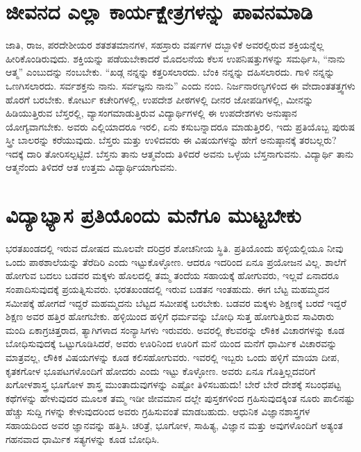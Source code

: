 \section{ಜೀವನದ ಎಲ್ಲಾ ಕಾರ್ಯಕ್ಷೇತ್ರಗಳನ್ನು ಪಾವನಮಾಡಿ}

ಜಾತಿ, ರಾಜ, ಪರದೇಶೀಯರ ಶತಶತಮಾನಗಳ, ಸಹಸ್ರಾರು ವರ್ಷಗಳ ದಬ್ಬಾಳಿಕೆ ಅವರಲ್ಲಿರುವ ಶಕ್ತಿಯನ್ನೆಲ್ಲ ಹೀರಿಕೊಂಡಿರುವುದು. ಶಕ್ತಿಯನ್ನು ಪಡೆಯಬೇಕಾದರೆ ಮೊದಲನೆಯ ಕೆಲಸ ಉಪನಿಷತ್ತುಗಳನ್ನು ಸಮರ್ಥಿಸಿ, “ನಾನು ಆತ್ಮ” ಎಂಬುದನ್ನು ನಂಬಬೇಕು. “ಖಡ್ಗ ನನ್ನನ್ನು ಕತ್ತರಿಸಲಾರದು. ಬೆಂಕಿ ನನ್ನನ್ನು ದಹಿಸಲಾರದು. ಗಾಳಿ ನನ್ನನ್ನು ಒಣಗಿಸಲಾರದು. ಸರ್ವಶಕ್ತನು ನಾನು. ಸರ್ವಜ್ಞನು ನಾನು” ಎಂದು ನಂಬಿ. ನಿರ್ಜನಾರಣ್ಯಗಳಿಂದ ಈ ವೇದಾಂತತತ್ತ್ವಗಳು ಹೊರಗೆ ಬರಬೇಕು. ಕೋರ್ಟು ಕಚೇರಿಗಳಲ್ಲಿ, ಉಪದೇಶ ಪೀಠಗಳಲ್ಲಿ ದೀನರ ಜೋಪಡಿಗಳಲ್ಲಿ, ಮೀನನ್ನು ಹಿಡಿಯುತ್ತಿರುವ ಬೆಸ್ತರಲ್ಲಿ, ವ್ಯಾಸಂಗಮಾಡುತ್ತಿರುವ ವಿದ್ಯಾರ್ಥಿಗಳಲ್ಲಿ ಈ ಉಪದೇಶಗಳು ಅನುಷ್ಠಾನ ಯೋಗ್ಯವಾಗಬೇಕು. ಅವರು ಎಲ್ಲಿಯಾದರೂ ಇರಲಿ, ಏನು ಕಸುಬನ್ನಾದರೂ ಮಾಡುತ್ತಿರಲಿ, ಇದು ಪ್ರತಿಯೊಬ್ಬ ಪುರುಷ ಸ್ತ್ರೀ ಬಾಲರನ್ನು ಕರೆಯುವುದು. ಬೆಸ್ತರು ಮತ್ತು ಉಳಿದವರು ಈ ವಿಷಯಗಳನ್ನು ಹೇಗೆ ಅನುಷ್ಠಾನಕ್ಕೆ ತರಬಲ್ಲರು? ಇದಕ್ಕೆ ದಾರಿ ತೋರಿಸಲ್ಪಟ್ಟಿದೆ. ಬೆಸ್ತನು ತಾನು ಆತ್ಮವೆಂದು ತಿಳಿದರೆ ಅವನು ಒಳ್ಳೆಯ ಬೆಸ್ತನಾಗುವನು. ವಿದ್ಯಾರ್ಥಿ ತಾನು ಆತ್ಮನೆಂದು ತಿಳಿದರೆ ಆತ ಉತ್ತಮ ವಿದ್ಯಾರ್ಥಿಯಾಗುವನು.


\section{ವಿದ್ಯಾಭ್ಯಾಸ ಪ್ರತಿಯೊಂದು ಮನೆಗೂ ಮುಟ್ಟಬೇಕು}

ಭರತಖಂಡದಲ್ಲಿ ಇರುವ ದೋಷದ ಮೂಲವೇ ದರಿದ್ರರ ಶೋಚನೀಯ ಸ್ಥಿತಿ. ಪ್ರತಿಯೊಂದು ಹಳ್ಳಿಯಲ್ಲಿಯೂ ನೀವು ಒಂದು ಪಾಠಶಾಲೆಯನ್ನು ತೆರೆದಿರಿ ಎಂದು ಇಟ್ಟುಕೊಳ್ಳೋಣ. ಆದರೂ ಇದರಿಂದ ಏನೂ ಪ್ರಯೋಜನ ವಿಲ್ಲ. ಶಾಲೆಗೆ ಹೋಗುವ ಬದಲು ಬಡವರ ಮಕ್ಕಳು ಹೊಲದಲ್ಲಿ ತಮ್ಮ ತಂದೆಯ ಸಹಾಯಕ್ಕೆ ಹೋಗುವರು, ಇಲ್ಲವೆ ಏನಾದರೂ ಸಂಪಾದಿಸುವುದಕ್ಕೆ ಪ್ರಯತ್ನಿಸುವರು. ಭರತಖಂಡದಲ್ಲಿ ಇರುವ ಬಡತನ ಇಂತಹುದು. ಈಗ ಬೆಟ್ಟ ಮಹಮ್ಮದನ ಸಮೀಪಕ್ಕೆ ಹೋಗದೆ ಇದ್ದರೆ ಮಹಮ್ಮದನು ಬೆಟ್ಟದ ಸಮೀಪಕ್ಕೆ ಬರಬೇಕು. ಬಡವರ ಮಕ್ಕಳು ಶಿಕ್ಷಣಕ್ಕೆ ಬರದೆ ಇದ್ದರೆ ಶಿಕ್ಷಣ ಅವರ ಹತ್ತಿರ ಹೋಗಬೇಕು. ಹಳ್ಳಿಯಿಂದ ಹಳ್ಳಿಗೆ ಧರ್ಮವನ್ನು ಬೋಧಿ ಸುತ್ತ ಹೋಗುತ್ತಿರುವ ಸಾವಿರಾರು ಮಂದಿ ಏಕಾಗ್ರಚಿತ್ತರಾದ, ತ್ಯಾಗಿಗಳಾದ ಸಂನ್ಯಾಸಿಗಳು ಇರುವರು. ಅವರಲ್ಲಿ ಕೆಲವರನ್ನು ಲೌಕಿಕ ವಿಚಾರಗಳನ್ನು ಕೂಡ ಬೋಧಿಸುವುದಕ್ಕೆ ಒಟ್ಟುಗೂಡಿಸಿದರೆ, ಅವರು ಊರಿನಿಂದ ಊರಿಗೆ ಮನೆ ಯಿಂದ ಮನೆಗೆ ಧಾರ್ಮಿಕ ವಿಚಾರವನ್ನು ಮಾತ್ರವಲ್ಲ, ಲೌಕಿಕ ವಿಷಯಗಳನ್ನು ಕೂಡ ಕಲಿಸಹೋಗುವರು. ಇವರಲ್ಲಿ ಇಬ್ಬರು ಒಂದು ಹಳ್ಳಿಗೆ ಮಾಯಾ ದೀಪ, ಕೃತಕಗೋಳ ಭೂಪಟಗಳೊಂದಿಗೆ ಹೋದರು ಎಂದು ಇಟ್ಟು ಕೊಳ್ಳೋಣ. ಅವರು ಏನೂ ಗೊತ್ತಿಲ್ಲದವರಿಗೆ ಖಗೋಳಶಾಸ್ತ್ರ ಭೂಗೋಳ ಶಾಸ್ತ್ರ ಮುಂತಾದುವುಗಳನ್ನು ಎಷ್ಟೋ ತಿಳಿಸಬಹುದು! ಬೇರೆ ಬೇರೆ ದೇಶಕ್ಕೆ ಸಬಂಧಪಟ್ಟ ಕಥೆಗಳನ್ನು ಹೇಳುವುದರ ಮೂಲಕ ತಮ್ಮ ಇಡೀ ಜೀವಮಾನ ದಲ್ಲೇ ಪುಸ್ತಕಗಳಿಂದ ಗ್ರಹಿಸುವುದಕ್ಕಿಂತ ನೂರು ಪಾಲಿನಷ್ಟು ಹೆಚ್ಚು ಸುದ್ದಿ ಗಳನ್ನು ಕೇಳುವುದರಿಂದ ಅವರು ಗ್ರಹಿಸುವಂತೆ ಮಾಡಬಹುದು. ಆಧುನಿಕ ವಿಜ್ಞಾನಶಾಸ್ತ್ರಗಳ ಸಹಾಯದಿಂದ ಅವರ ಜ್ಞಾನವನ್ನು ಹತ್ತಿಸಿ. ಚರಿತ್ರೆ, ಭೂಗೋಳ, ಸಾಹಿತ್ಯ, ವಿಜ್ಞಾನ ಮತ್ತು ಅವುಗಳೊಂದಿಗೆ ಅತ್ಯಂತ ಗಹನವಾದ ಧಾರ್ಮಿಕ ಸತ್ಯಗಳನ್ನು ಕೂಡ ಬೋಧಿಸಿ.

